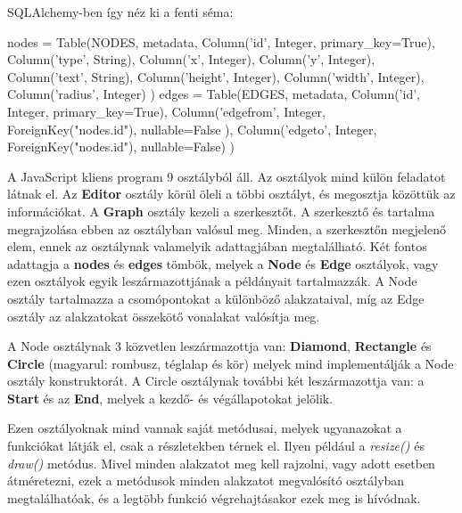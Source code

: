 SQLAlchemy-ben így néz ki a fenti séma:

\begin{python}
            nodes = Table(NODES, metadata,
                        Column('id', Integer, primary_key=True),
                        Column('type', String),
                        Column('x', Integer),
                        Column('y', Integer),
                        Column('text', String),
                        Column('height', Integer),
                        Column('width', Integer),
                        Column('radius', Integer)
                        )
            edges = Table(EDGES, metadata,
                        Column('id', Integer, primary_key=True),
                        Column('edgefrom', Integer, 
ForeignKey("nodes.id"), nullable=False ),
                        Column('edgeto', Integer, 
ForeignKey("nodes.id"), nullable=False)
                        ) 
\end{python}

\newpage

A JavaScript kliens program 9 osztályból áll. Az osztályok mind külön feladatot látnak el. Az \textbf{Editor} osztály körül öleli a többi osztályt, és megosztja közöttük az információkat. A \textbf{Graph} osztály kezeli a szerkesztőt. A szerkesztő és tartalma megrajzolása ebben az osztályban valósul meg. Minden, a szerkesztőn megjelenő elem, ennek az osztálynak valamelyik adattagjában megtalálható. Két fontos adattagja a \textbf{nodes} és \textbf{edges} tömbök, melyek a \textbf{Node} és \textbf{Edge} osztályok, vagy ezen osztályok egyik leszármazottjának a példányait tartalmazzák. A Node osztály tartalmazza a csomópontokat a különböző alakzataival, míg az Edge osztály az alakzatokat összekötő vonalakat valósítja meg.
 
A Node osztálynak 3 közvetlen leszármazottja van: \textbf{Diamond}, \textbf{Rectangle} és \textbf{Circle} (magyarul: rombusz, téglalap és kör) melyek mind implementálják a Node osztály konstruktorát. A Circle osztálynak további két leszármazottja van: a \textbf{Start} és az \textbf{End}, melyek a kezdő- és végállapotokat jelölik.

Ezen osztályoknak mind vannak saját metódusai, melyek ugyanazokat a funkciókat látják el, csak a részletekben térnek el. Ilyen például a \textit{resize()} és \textit{draw()} metódus. Mivel minden alakzatot meg kell rajzolni, vagy adott esetben átméretezni, ezek a metódusok minden alakzatot megvalósító osztályban megtalálhatóak, és a legtöbb funkció végrehajtásakor ezek meg is hívódnak.

